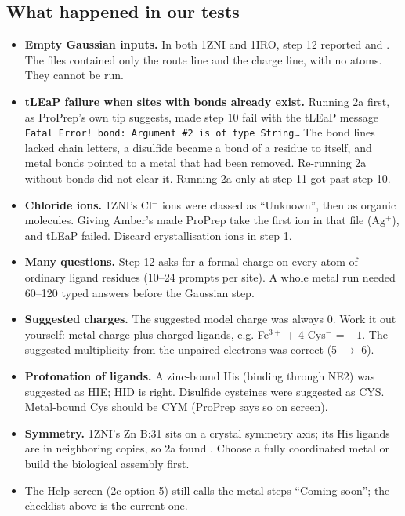 \subsection*{What happened in our tests}

\begin{itemize}
  \item \textbf{Empty Gaussian inputs.} In both 1ZNI and 1IRO, step 12
        reported  and
        . The
         files contained only the route line and the charge line,
        with no atoms. They cannot be run.
  \item \textbf{tLEaP failure when sites with bonds already exist.} Running 2a
        first, as ProPrep's own tip suggests, made step 10 fail with the tLEaP message
        \texttt{Fatal Error! bond: Argument \#2 is of type String\ldots} The bond
        lines lacked chain letters, a disulfide became a bond of a residue to
        itself, and metal bonds pointed to a metal that had been removed.
        Re-running 2a without bonds did not clear it. Running 2a only at
        step 11 got past step 10.
  \item \textbf{Chloride ions.} 1ZNI's Cl$^-$ ions were classed as
        ``Unknown'', then as organic molecules. Giving Amber's
         made ProPrep take the first ion in that file
        (Ag$^+$), and tLEaP failed. Discard crystallisation ions in step 1.
  \item \textbf{Many questions.} Step 12 asks for a formal charge on every
        atom of ordinary ligand residues (10--24 prompts per site). A whole
        metal run needed 60--120 typed answers before the Gaussian step.
  \item \textbf{Suggested charges.} The suggested model charge was always 0.
        Work it out yourself: metal charge plus charged ligands, e.g.
        Fe$^{3+}$ + 4 Cys$^-$ = $-1$. The suggested multiplicity from the
        unpaired electrons was correct (5 $\to$ 6).
  \item \textbf{Protonation of ligands.} A zinc-bound His (binding through NE2)
        was suggested as HIE; HID is right. Disulfide cysteines were suggested
        as CYS. Metal-bound Cys should be CYM (ProPrep says so on screen).
  \item \textbf{Symmetry.} 1ZNI's Zn B:31 sits on a crystal symmetry axis;
        its His ligands are in neighboring copies, so 2a found
        . Choose a fully coordinated metal or
        build the biological assembly first.
  \item The Help screen (2c option 5) still calls the metal steps
        ``Coming soon''; the checklist above is the current one.
\end{itemize}

